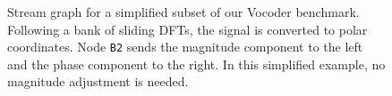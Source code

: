 
\begin{figure}[t]
\centering
{}
\caption{Stream graph for a simplified subset of our Vocoder
benchmark.  Following a bank of sliding DFTs, the signal is converted
to polar coordinates.  Node {\tt B2} sends the magnitude component to
the left and the phase component to the right.  In this simplified
example, no magnitude adjustment is needed.\label{fig:vocoder}}
\end{figure}

\begin{figure*}[t]
\caption{Parallel execution models for stream programs.  Each block corresponds to a filter in the Vocoder example (Figure~\ref{fig:vocoder}).  The height of the block reflects the amount of work contained in the filter.\label{fig:exemodel}}
\end{figure*}
